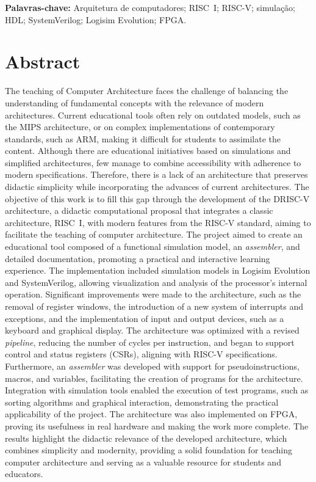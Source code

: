 \documentclass[
	12pt,				%
	openright,			%
	oneside,			%
	a4paper,			%
	english,			%
	french,				%
	spanish,			%
	brazil,				%
	]{abntex2}
\begin{document}
\vspace{1em}
\noindent
\textbf{Palavras-chave:} Arquitetura de computadores; RISC~I; RISC-V; simulação; HDL; SystemVerilog; Logisim Evolution; FPGA.

\chapter*{Abstract}

\noindent
The teaching of Computer Architecture faces the challenge of balancing the understanding of fundamental concepts with the relevance of modern architectures. Current educational tools often rely on outdated models, such as the MIPS architecture, or on complex implementations of contemporary standards, such as ARM, making it difficult for students to assimilate the content. Although there are educational initiatives based on simulations and simplified architectures, few manage to combine accessibility with adherence to modern specifications. Therefore, there is a lack of an architecture that preserves didactic simplicity while incorporating the advances of current architectures. The objective of this work is to fill this gap through the development of the DRISC-V architecture, a didactic computational proposal that integrates a classic architecture, RISC~I, with modern features from the RISC-V standard, aiming to facilitate the teaching of computer architecture. The project aimed to create an educational tool composed of a functional simulation model, an \textit{assembler}, and detailed documentation, promoting a practical and interactive learning experience. The implementation included simulation models in Logisim Evolution and SystemVerilog, allowing visualization and analysis of the processor's internal operation. Significant improvements were made to the architecture, such as the removal of register windows, the introduction of a new system of interrupts and exceptions, and the implementation of input and output devices, such as a keyboard and graphical display. The architecture was optimized with a revised \textit{pipeline}, reducing the number of cycles per instruction, and began to support control and status registers (CSRs), aligning with RISC-V specifications. Furthermore, an \textit{assembler} was developed with support for pseudoinstructions, macros, and variables, facilitating the creation of programs for the architecture. Integration with simulation tools enabled the execution of test programs, such as sorting algorithms and graphical interaction, demonstrating the practical applicability of the project. The architecture was also implemented on FPGA, proving its usefulness in real hardware and making the work more complete. The results highlight the didactic relevance of the developed architecture, which combines simplicity and modernity, providing a solid foundation for teaching computer architecture and serving as a valuable resource for students and educators.
\end{document}
